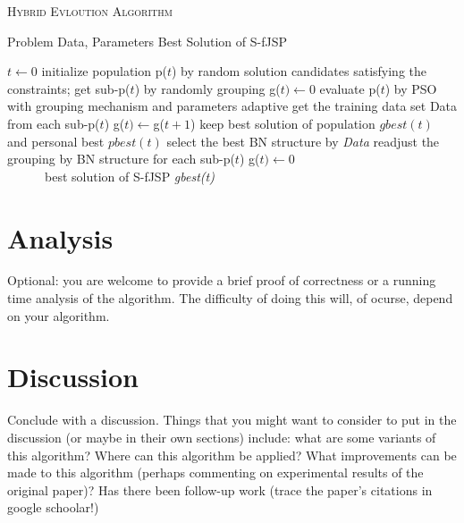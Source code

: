\documentclass[11pt]{article}
\begin{document}
\begin{algorithm}\caption{\textsc{Hybrid Evloution Algorithm}}
 \begin{algorithmic}[1]
    Problem Data, Parameters
    Best Solution of S-fJSP
   
   \State $t \gets 0$
   \State initialize population p($t$) by random solution candidates satisfying the constraints;
 get sub-p($t$) by randomly grouping
 	\State g($t) \gets 0$
	\State evaluate p($t$) by PSO with grouping mechanism and parameters adaptive
 	\State get the training data set Data from each sub-p($t$)
 	\State g($t) \gets $g($t + 1$)
 	\State keep best solution of population $gbest(t)$ and personal best $pbest(t)$
 	\State select the best BN structure by \textit{Data}
 	\State readjust the grouping by BN structure for each sub-p($t$)
 	\State g($t) \gets 0$
 	\EndIf
        \EndWhile\\
~~~~~~\Return best solution of S-fJSP \textit{gbest(t)}
 \end{algorithmic}
\end{algorithm}

\section{Analysis}
Optional: you are welcome to provide a brief proof of correctness or a 
running time analysis of the algorithm.  The difficulty of doing this will, of 
ocurse, depend on your algorithm.

\section{Discussion}
Conclude with a discussion.  Things that you might want to consider to put in 
the discussion (or maybe in their own sections) include: what are some variants 
of this algorithm? Where can this algorithm be applied?  What improvements can 
be made to this algorithm (perhaps commenting on experimental results of the 
original paper)?  Has there been follow-up work (trace the paper's citations in 
google schoolar!)
\end{document}
